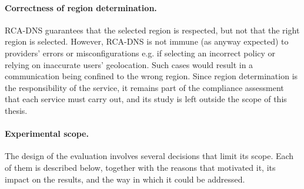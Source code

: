 \paragraph{Correctness of region determination.} RCA-DNS guarantees that the selected region is respected, but not that the right region is selected. However, RCA-DNS is not immune (as anyway expected) to providers' errors or misconfigurations e.g. if selecting an incorrect policy or relying on inaccurate users' geolocation. Such cases would result in a communication being confined to the wrong region. Since region determination is the responsibility of the service, it remains part of the compliance assessment that each service must carry out, and its study is left outside the scope of this thesis.

\paragraph{Experimental scope.} The design of the evaluation involves several decisions that limit its scope. Each of them is described below, together with the reasons that motivated it, its impact on the results, and the way in which it could be addressed.

